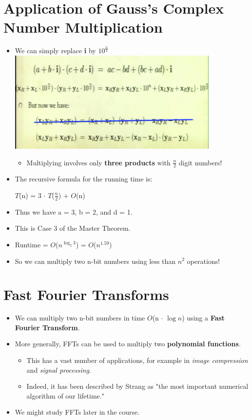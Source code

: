 \documentclass[12pt]{article}
\begin{document}
\section{Application of Gauss's Complex Number Multiplication}
\renewcommand{\labelitemii}{$\circ$}
\renewcommand{\labelitemiii}{$\cdot$}
\renewcommand{\labelitemiii}{$\rightarrow$}
\begin{itemize}
\item We can simply replace \textbf{i} by $10^{\frac{n}{2}}$\\
\includegraphics{lecture44}
	\begin{itemize}
	\item Multiplying involves only \textbf{three products} with ${\frac{n}{2}}$ digit numbers!
	\end{itemize}
\item The recursive formula for the running time is: 

	\hspace*{\fill} {\large $T$(n) = 3 $\cdot$ $T$($\frac{n}{2}$) + $O$(n) } \hspace*{\fill} 
	
\item Thus we have a = 3, b = 2, and d = 1.
\item This is Case 3 of the Master Theorem.
\item Runtime = $O$($n^{\log_2 3}$) = $O$($n^{1.59}$)
\item So we can multiply two n-bit numbers using less than $n^2$ operations!
\end{itemize}

\section{Fast Fourier Transforms}
\renewcommand{\labelitemii}{$\circ$}
\renewcommand{\labelitemiii}{$\cdot$}
\renewcommand{\labelitemiii}{$\rightarrow$}
\begin{itemize}
\item We can multiply two n-bit numbers in time $O$(n $\cdot$ $\log{}n$) using a \textbf{Fast Fourier Transform}.
\item More generally, FFTs can be used to multiply two \textbf{polynomial functions}.
	\begin{itemize}
	\item This has a vast number of applications, for example in \textit{image compression} and \textit{signal processing}.
	\item Indeed, it has been described by Strang as "the most important numerical algorithm of our lifetime."
	\end{itemize}
\item We might study FFTs later in the course.
\end{itemize}
\end{document}
